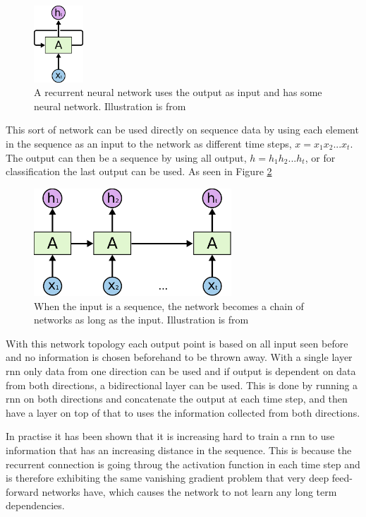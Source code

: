 \begin{figure}
	\centering
	\includegraphics[width=5em]{sections/theory/RNN-rolled.png}
	\caption{A recurrent neural network uses the output as input 
		and has some neural network. Illustration is from \cite{rnn}}
	\label{fig:rnn}
\end{figure}

This sort of network can be used directly on sequence data by using each element in the sequence as
an input to the network as different time steps, $x=x_1x_2...x_t$. The output can then be a sequence 
by using all output, $h=h_1h_2...h_t$, or for classification the last output can be used. 
As seen in Figure \ref{fig:rnn-seq}

\begin{figure}
	\centering
	\includegraphics[width=20em]{sections/theory/RNN-unrolled.png}
	\caption{When the input is a sequence, the network becomes a chain of networks 
		as long as the input. Illustration is from \cite{rnn}}
	\label{fig:rnn-seq}
\end{figure}

With this network topology each output point is based on all input seen before and no information is 
chosen beforehand to be thrown away. With a single layer \gls{rnn} only data from one direction can be used
and if output is dependent on data from both directions, a bidirectional layer can be used. This is 
done by running a \gls{rnn} on both directions and concatenate the output at each time step, 
and then have a layer on top of that to uses the information collected from both directions.

In practise it has been shown that it is increasing hard\cite{rnnLTD} to train a \gls{rnn} to 
use information that has an increasing distance in the sequence. This is because the recurrent connection 
is going throug the activation function in each time step and is therefore exhibiting the same vanishing 
gradient problem that very deep feed-forward networks have, which causes the network to not learn 
any long term dependencies. 

